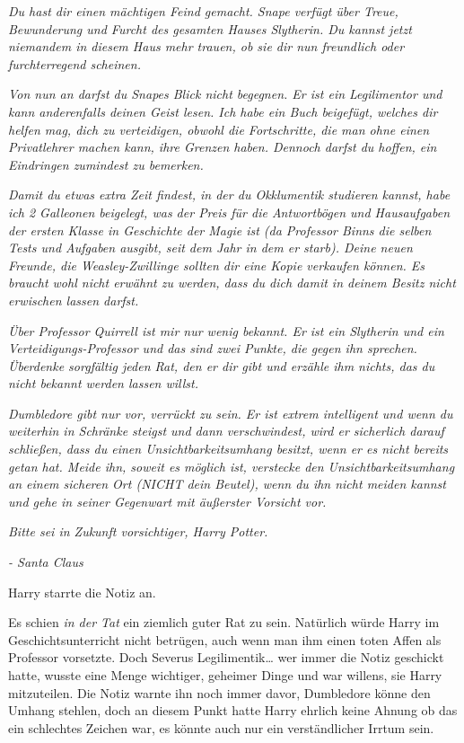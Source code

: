 {\emph{Du hast dir einen mächtigen Feind gemacht. Snape verfügt über Treue, Bewunderung und Furcht des gesamten Hauses Slytherin. Du kannst jetzt niemandem in diesem Haus mehr trauen, ob sie dir nun freundlich oder furchterregend scheinen.}

\emph{Von nun an darfst du Snapes Blick nicht begegnen. Er ist ein Legilimentor und kann anderenfalls deinen Geist lesen. Ich habe ein Buch beigefügt, welches dir helfen mag, dich zu verteidigen, obwohl die Fortschritte, die man ohne einen Privatlehrer machen kann, ihre Grenzen haben. Dennoch darfst du hoffen, ein Eindringen zumindest zu bemerken.}

\emph{Damit du etwas extra Zeit findest, in der du Okklumentik studieren kannst, habe ich 2 Galleonen beigelegt, was der Preis für die Antwortbögen und Hausaufgaben der ersten Klasse in Geschichte der Magie ist (da Professor Binns die selben Tests und Aufgaben ausgibt, seit dem Jahr in dem er starb). Deine neuen Freunde, die Weasley-Zwillinge sollten dir eine Kopie verkaufen können. Es braucht wohl nicht erwähnt zu werden, dass du dich damit in deinem Besitz nicht erwischen lassen darfst.}

\emph{Über Professor Quirrell ist mir nur wenig bekannt. Er ist ein Slytherin und ein Verteidigungs-Professor und das sind zwei Punkte, die gegen ihn sprechen. Überdenke sorgfältig jeden Rat, den er dir gibt und erzähle ihm nichts, das du nicht bekannt werden lassen willst.}

\emph{Dumbledore gibt nur vor, verrückt zu sein. Er ist extrem intelligent und wenn du weiterhin in Schränke steigst und dann verschwindest, wird er sicherlich darauf schließen, dass du einen Unsichtbarkeitsumhang besitzt, wenn er es nicht bereits getan hat. Meide ihn, soweit es möglich ist, verstecke den Unsichtbarkeitsumhang an einem sicheren Ort (NICHT dein Beutel), wenn du ihn nicht meiden kannst und gehe in seiner Gegenwart mit äußerster Vorsicht vor.}

\emph{Bitte sei in Zukunft vorsichtiger, Harry Potter.}

\emph{- Santa Claus}

Harry starrte die Notiz an.

Es schien \emph{in der Tat} ein ziemlich guter Rat zu sein. Natürlich würde Harry im Geschichtsunterricht nicht betrügen, auch wenn man ihm einen toten Affen als Professor vorsetzte. Doch Severus Legilimentik… wer immer die Notiz geschickt hatte, wusste eine Menge wichtiger, geheimer Dinge und war willens, sie Harry mitzuteilen. Die Notiz warnte ihn noch immer davor, Dumbledore könne den Umhang stehlen, doch an diesem Punkt hatte Harry ehrlich keine Ahnung ob das ein schlechtes Zeichen war, es könnte auch nur ein verständlicher Irrtum sein.

}
